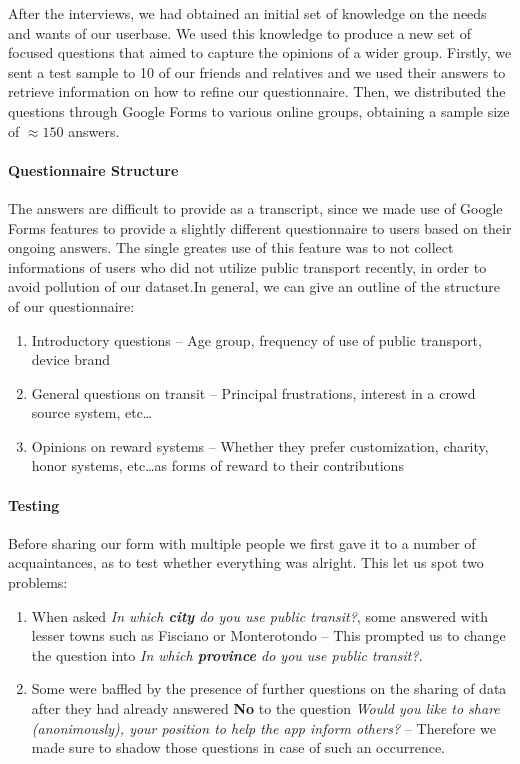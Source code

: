 \documentclass[a4paper, 11pt]{report}
\begin{document}
After the interviews, we had obtained an initial set of knowledge on the needs and wants of
our userbase. We used this knowledge to produce a new set of focused questions that aimed
to capture the opinions of a wider group. Firstly, we sent a test sample to 10 of our friends
and relatives and we used their answers to retrieve information on how to refine our questionnaire.
Then, we distributed the questions through Google Forms to various online groups, 
obtaining a sample size of $\approx150$ answers.

\paragraph{Questionnaire Structure}

The answers are difficult to provide as a transcript, since we made use of Google Forms
features to provide a slightly different questionnaire to users based on their ongoing answers.
The single greates use of this feature was to not collect informations of users who did not
utilize public transport recently, in order to avoid pollution of our dataset.\@ In
general, we can give an outline of the structure of our questionnaire:

\begin{enumerate}
	\item Introductory questions -- Age group, frequency of use of public transport, device brand
	\item General questions on transit -- Principal frustrations, interest in a crowd source system, etc\dots
	\item Opinions on reward systems -- Whether they prefer customization, charity, honor systems, etc\dots\@ as
	      forms of reward to their contributions
\end{enumerate}

\paragraph{Testing}
Before sharing our form with multiple people we first gave it to a number of acquaintances,
as to test whether everything was alright. This let us spot two problems:
\begin{enumerate}
	\item When asked \emph{In which \textbf{city} do you use public transit?}, some answered
	with lesser towns such as Fisciano or Monterotondo -- This prompted us to change the
	question into \emph{In which \textbf{province} do you use public transit?}.
	\item Some were baffled by the presence of further questions on the sharing of data after
	they had already answered \textbf{No} to the question \emph{Would you like to share
	(anonimously), your position to help the app inform others?} -- Therefore we made sure to
	shadow those questions in case of such an occurrence.
\end{enumerate}
\end{document}
